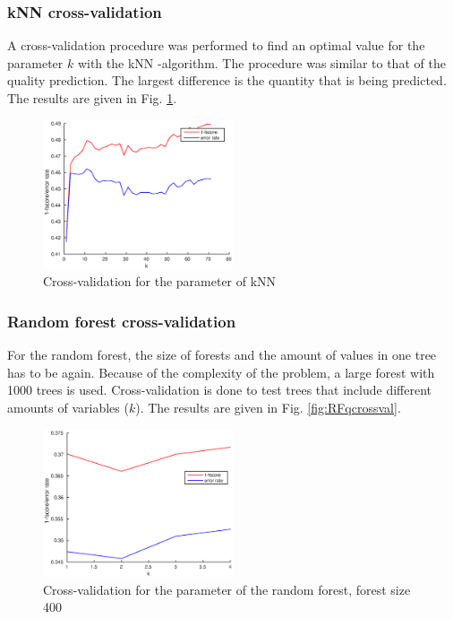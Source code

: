 \documentclass[twoside]{article}
\begin{document}
\begin{multicols}{2}
\subsubsection{kNN cross-validation}

A cross-validation procedure was performed to find an optimal value for the parameter $k$ with the 
kNN -algorithm. The procedure was similar to that of the quality prediction. The largest difference is
the quantity that is being predicted. The results are given in
Fig. \ref{fig:knnqcrossval}.

\begin{figure}[H]
\centering
\includegraphics[width=0.5\textwidth]{knnqcrossval}
\caption{Cross-validation for the parameter of kNN}
\label{fig:knnqcrossval}
\end{figure}

\subsubsection{Random forest cross-validation}

For the random forest, the size of forests and the amount of values in one tree has to be again.
Because of the complexity of the problem, a large forest with 1000 trees is used. Cross-validation
is done to test trees that include different amounts of variables ($k$). The results are given in Fig. 
\ref{fig:RFqcrossval}.

\begin{figure}[H]
\centering
\includegraphics[width=0.5\textwidth]{RFqcrossval}
\caption{Cross-validation for the parameter of the random forest, forest size 400}
\label{fig:RFq1000crossval}
\end{figure}


\end{multicols}
\end{document}
